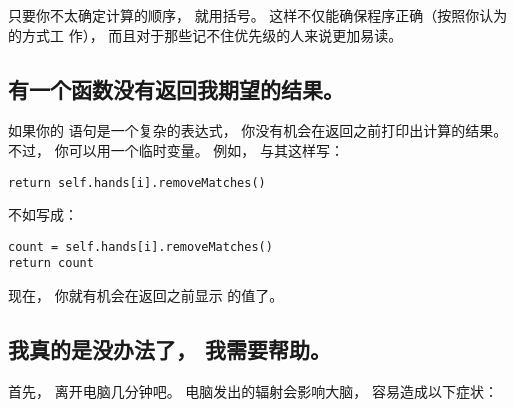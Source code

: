只要你不太确定计算的顺序， 就用括号。  这样不仅能确保程序正确（按照你认为的方式工
作）， 而且对于那些记不住优先级的人来说更加易读。


\subsection{有一个函数没有返回我期望的结果。  }



如果你的  语句是一个复杂的表达式， 你没有机会在返回之前打印出计算的结果。
不过， 你可以用一个临时变量。  例如， 与其这样写：

\begin{lstlisting}
return self.hands[i].removeMatches()
\end{lstlisting}


不如写成：

\begin{lstlisting}
count = self.hands[i].removeMatches()
return count
\end{lstlisting}


现在， 你就有机会在返回之前显示  的值了。


\subsection{我真的是没办法了， 我需要帮助。}


首先， 离开电脑几分钟吧。
电脑发出的辐射会影响大脑， 容易造成以下症状：

